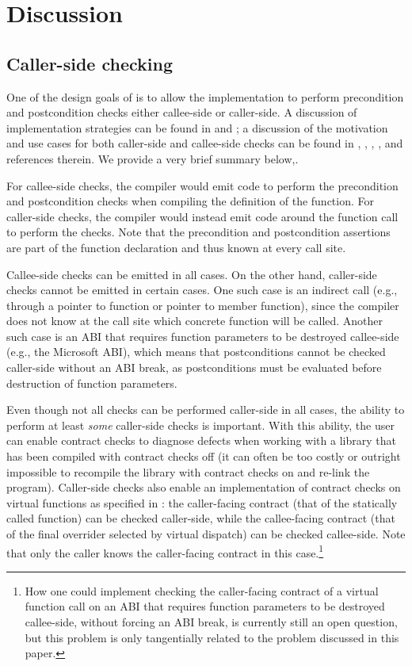 \section{Discussion}

\subsection{Caller-side checking}

One of the design goals of \cite{P2900R10} is to allow the implementation to perform precondition and postcondition checks either callee-side or caller-side. A discussion of implementation strategies can be found in \cite{P3267R0} and \cite{P3321R0}; a discussion of the motivation and use cases for both caller-side and callee-side checks can be found in \cite{P3228R1}, \cite{P3264R1}, \cite{P3270R0}, \cite{P3321R0}, and references therein. We provide a very brief summary below,.

For callee-side checks, the compiler would emit code to perform the precondition and postcondition checks when compiling the definition of the function. For caller-side checks, the compiler would instead emit code around the function call to perform the checks. Note that the precondition and postcondition assertions are part of the function declaration and thus known at every call site.

Callee-side checks can be emitted in all cases. On the other hand, caller-side checks cannot be emitted in certain cases. One such case is an indirect call (e.g., through a pointer to function or pointer to member function), since the compiler does not know at the call site which concrete function will be called. Another such case is an ABI that requires function parameters to be destroyed callee-side (e.g., the Microsoft ABI), which means that postconditions cannot be checked caller-side without an ABI break, as postconditions must be evaluated before destruction of function parameters.

Even though not all checks can be performed caller-side in all cases, the ability to perform at least \emph{some} caller-side checks is important. With this ability, the user can enable contract checks to diagnose defects when working with a library that has been compiled with contract checks off (it can often be too costly or outright impossible to recompile the library with contract checks on and re-link the program). Caller-side checks also enable an implementation of contract checks on virtual functions as specified in \cite{P2900R10}: the caller-facing contract (that of the statically called function) can be checked caller-side, while the callee-facing contract (that of the final overrider selected by virtual dispatch) can be checked callee-side. Note that only the caller knows the caller-facing contract in this case.\footnote{How one could implement checking the caller-facing contract of a virtual function call on an ABI that requires function parameters to be destroyed callee-side, without forcing an ABI break, is currently still an open question, but this problem is only tangentially related to the problem discussed in this paper.}

